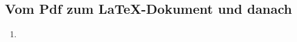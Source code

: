 
\foreword

\subsection*{Vom Pdf zum \LaTeX{}-Dokument und danach}


\begin{enumerate}{\textbullet}

\item

\end{enumerate}